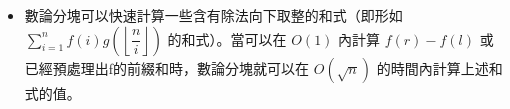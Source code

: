 \begin{itemize}
\item 數論分塊可以快速計算一些含有除法向下取整的和式（即形如 $\sum_{i=1}^{n} f(i) g(\left\lfloor\dfrac ni\right\rfloor)$ 的和式）。當可以在 $O(1)$ 內計算 $f(r)-f(l)$ 或已經預處理出f的前綴和時，數論分塊就可以在 $O(\sqrt n)$ 的時間內計算上述和式的值。
\end{itemize}